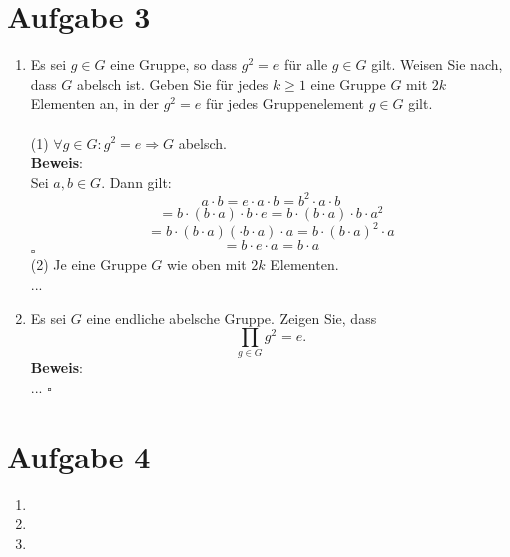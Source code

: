 \documentclass[11pt,a4paper,ngerman]{article}
\begin{document}
\section*{Aufgabe 3}
\begin{enumerate}[\bfseries a)]
\item Es sei $g \in G$ eine Gruppe, so dass $g^2 = e$ für alle $g \in G$ gilt. Weisen Sie nach, dass $G$ abelsch ist. Geben Sie für jedes $k \geq 1$ eine Gruppe $G$ mit $2k$ Elementen an, in der $g^2 = e$ für jedes Gruppenelement $g \in G$ gilt.
\\ \\
(1) $\forall g \in G: g^2 = e \Rightarrow G$ abelsch. \\
\textbf{Beweis}: \\
Sei $a,b \in G$. Dann gilt:
$$ a \cdot b = e \cdot a \cdot b = b^2 \cdot a \cdot b $$
$$ = b \cdot (b \cdot a) \cdot b \cdot e = b \cdot (b \cdot a) \cdot b \cdot a^2 $$
$$ = b \cdot (b \cdot a) (\cdot b \cdot a) \cdot a = b \cdot (b \cdot a)^2 \cdot a $$
$$ = b \cdot e \cdot a = b \cdot a$$
\mbox{} \hfill $\square$
\\
(2) Je eine Gruppe $G$ wie oben mit $2k$ Elementen. \\
...
\item Es sei $G$ eine endliche abelsche Gruppe. Zeigen Sie, dass 
$$ \prod_{g\in G}g^2 = e.$$
\textbf{Beweis}: \\
...
\mbox{} \hfill $\square$
\end{enumerate}

\section*{Aufgabe 4}
\begin{enumerate}[\bfseries a)]
\item

\item


\item

\end{enumerate}

\label{LastPage}
\end{document}

